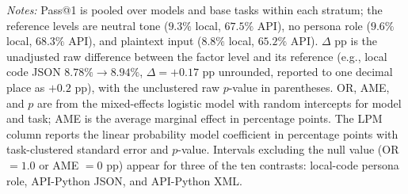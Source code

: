 \documentclass[a4paper,fleqn]{cas-sc}
\begin{document}
\begin{table}[htbp]
\vspace{2pt}
\begin{minipage}{\linewidth}
\footnotesize
\textit{Notes:} Pass@1 is pooled over models and base tasks within each stratum; the reference levels are neutral tone ($9.3\%$ local, $67.5\%$ API), no persona role ($9.6\%$ local, $68.3\%$ API), and plaintext input ($8.8\%$ local, $65.2\%$ API). $\Delta$ pp is the unadjusted raw difference between the factor level and its reference (e.g., local code JSON $8.78\% \to 8.94\%$, $\Delta = +0.17$ pp unrounded, reported to one decimal place as $+0.2$ pp), with the unclustered raw $p$-value in parentheses. OR, AME, and $p$ are from the mixed-effects logistic model with random intercepts for model and task; AME is the average marginal effect in percentage points. The LPM column reports the linear probability model coefficient in percentage points with task-clustered standard error and $p$-value. Intervals excluding the null value (OR $= 1.0$ or AME $= 0$ pp) appear for three of the ten contrasts: local-code persona role, API-Python JSON, and API-Python XML.
\end{minipage}
\end{table}
\end{document}
